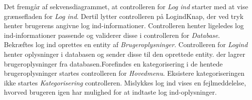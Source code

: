 \noindent
Det fremgår af sekvensdiagrammet, at controlleren for \textit{Log ind} starter med at vise grænsefladen for \textit{Log ind}. Dertil lytter controlleren på LogindKnap, der ved tryk henter brugerens angivne log ind-informationer. Controlleren henter ligeledes log ind-informationer passende og validerer disse i controlleren for \textit{Database}. Bekræftes log ind oprettes en entity af \textit{Brugeroplysninger}. Controlleren for \textit{Logind} henter oplysninger i databasen og sender disse til den oprettede entity. der lagrer brugeroplysninger fra databasen.Forefindes en kategorisering i de hentede brugeroplysninger startes controlleren for \textit{Hovedmenu}. Eksistere kategoriseringen ikke startes \textit{Kategorisering} controlleren. Mislykkes log ind vises en fejlmeddelelse, hvorved brugeren igen har mulighed for at indtaste log ind-oplysninger. 
